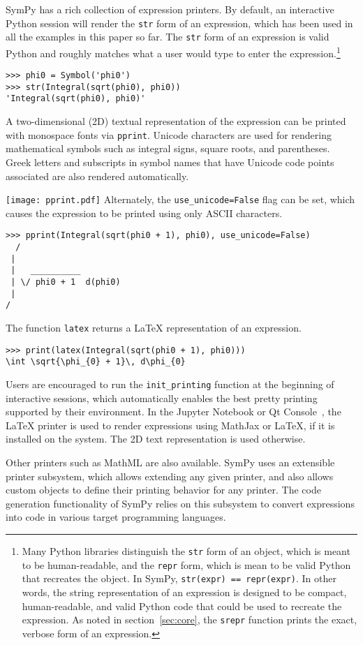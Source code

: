SymPy has a rich collection of expression printers. By default, an interactive
Python session will render the \verb|str| form of an expression, which has
been used in all the examples in this paper so far. The \verb|str| form of an
expression is valid Python and roughly matches what a user would type to enter
the expression.\footnote{\label{note:repr}Many Python libraries distinguish the \texttt{str}
  form of an object, which is meant to be human-readable, and the
  \texttt{repr} form, which is mean to be valid Python that recreates the
  object. In SymPy, \texttt{str(expr) == repr(expr)}. In other words, the
  string representation of an expression is designed to be compact,
  human-readable, and valid Python code that could be used to recreate the
  expression. As noted in section~\ref{sec:core}, the \texttt{srepr}
  function prints the exact, verbose form of an expression.}

\begin{verbatim}
>>> phi0 = Symbol('phi0')
>>> str(Integral(sqrt(phi0), phi0))
'Integral(sqrt(phi0), phi0)'
\end{verbatim}

A two-dimensional (2D) textual representation of the expression can
be printed with monospace fonts via \verb|pprint|.
Unicode characters are used for rendering mathematical symbols such as integral signs,
square roots, and parentheses. Greek letters and subscripts in symbol names
that have Unicode code points associated
are also rendered automatically.

\noindent
\texttt{[image: pprint.pdf]}
Alternately, the \verb|use_unicode=False| flag can be set, which causes the
expression to be printed using only ASCII characters.

\begin{verbatim}
>>> pprint(Integral(sqrt(phi0 + 1), phi0), use_unicode=False)
  /
 |
 |   __________
 | \/ phi0 + 1  d(phi0)
 |
/
\end{verbatim}

The function \verb|latex| returns a \LaTeX{} representation of an expression.

\begin{verbatim}
>>> print(latex(Integral(sqrt(phi0 + 1), phi0)))
\int \sqrt{\phi_{0} + 1}\, d\phi_{0}
\end{verbatim}

Users are encouraged to run the \verb|init_printing| function at the beginning
of interactive sessions, which automatically enables the best pretty printing
supported by their environment. In the Jupyter Notebook or Qt
Console~\cite{perez2007ipython}, the \LaTeX{} printer is used to render
expressions using MathJax or \LaTeX{}, if it is installed on the system. The
2D text representation is used otherwise.

Other printers such as MathML are also available. SymPy uses an extensible
printer subsystem, which allows extending any given printer, and also allows
custom objects to define their printing behavior for any printer. The code
generation functionality of SymPy relies on this subsystem to convert
expressions into code in various target programming languages.
